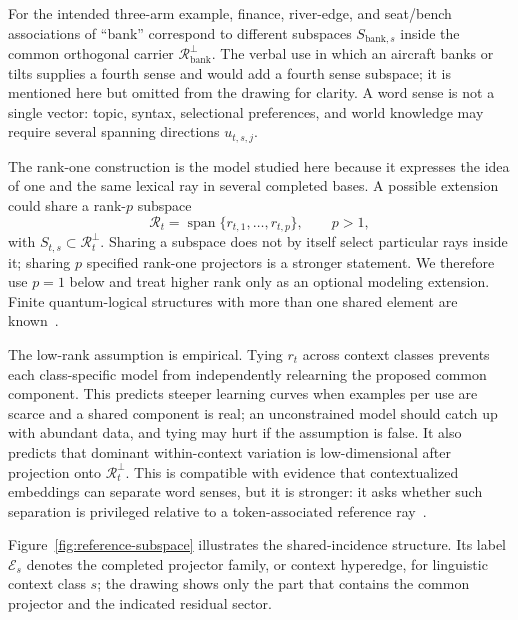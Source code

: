 \documentclass[
  aps,
  reprint,
  superscriptaddress,
  floatfix,
  nofootinbib,
  longbibliography
]{revtex4-2}
\DeclareMathOperator{\spanop}{span}
\begin{document}
For the intended three-arm example, finance, river-edge, and seat/bench
associations of ``bank'' correspond to different subspaces
$S_{\mathrm{bank},s}$ inside the common orthogonal carrier
$\mathcal R_{\mathrm{bank}}^\perp$.  The verbal use in which an aircraft
banks or tilts supplies a fourth sense and would add a fourth sense
subspace; it is mentioned here but omitted from the drawing for clarity.  A
word sense is not a single vector: topic, syntax, selectional preferences,
and world knowledge may require several spanning directions $u_{t,s,j}$.

The rank-one construction is the model studied here because it expresses the
idea of one and the same lexical ray in several completed bases.  A possible extension
could share a rank-$p$ subspace
%
\begin{equation}
\label{eq:reference-subspace}
\mathcal R_t=
\spanop\{r_{t,1},\dots,r_{t,p}\},
\qquad p>1,
\end{equation}
%
with $S_{t,s}\subset\mathcal R_t^\perp$.  Sharing a subspace does not by itself
select particular rays inside it; sharing $p$ specified rank-one projectors is
a stronger statement.  We therefore use $p=1$ below and treat higher rank only
as an optional modeling extension.  Finite quantum-logical structures with
more than one shared element are known~\cite{svozil:040102}.

The low-rank assumption is empirical.  Tying $r_t$ across context classes
prevents each class-specific model from independently relearning the proposed common
component.  This predicts steeper learning curves when examples per use are
scarce and a shared component is real; an unconstrained model should catch up
with abundant data, and tying may hurt if the assumption is false.  It also predicts that dominant
within-context variation is low-dimensional after projection onto
$\mathcal R_t^\perp$.  This is compatible with evidence that contextualized
embeddings can separate word senses, but it is stronger: it asks whether
such separation is privileged relative to a token-associated reference
ray~\cite{wiedemann2019does,scarlini2020ares}.

Figure~\ref{fig:reference-subspace} illustrates the shared-incidence structure.
Its label $\mathcal E_s$ denotes the completed projector family, or context
hyperedge, for linguistic context class $s$; the drawing shows only the part
that contains the common projector and the indicated residual sector.
\end{document}
